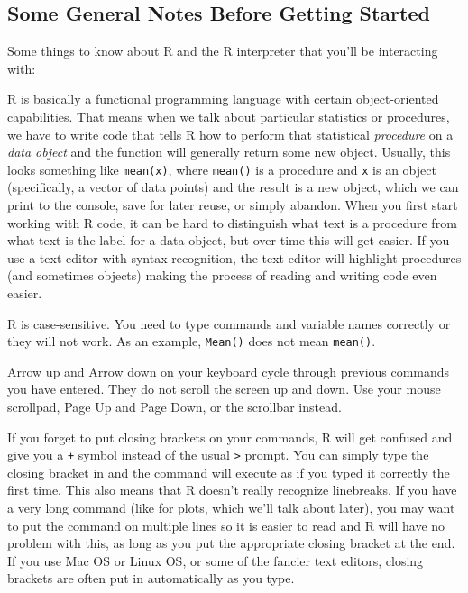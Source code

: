 \documentclass[12pt]{article}\usepackage[]{graphicx}\usepackage[]{color}
\begin{document}
\subsection{Some General Notes Before Getting Started}

Some things to know about R and the R interpreter that you'll be interacting with:

\begin{itemize*}
\item R is basically a functional programming language with certain object-oriented capabilities. That means when we talk about particular statistics or procedures, we have to write code that tells R how to perform that statistical \emph{procedure} on a \emph{data object} and the function will generally return some new object. Usually, this looks something like \texttt{mean(x)}, where \texttt{mean()} is a procedure and \texttt{x} is an object (specifically, a vector of data points) and the result is a new object, which we can print to the console, save for later reuse, or simply abandon. When you first start working with R code, it can be hard to distinguish what text is a procedure from what text is the label for a data object, but over time this will get easier. If you use a text editor with syntax recognition, the text editor will highlight procedures (and sometimes objects) making the process of reading and writing code even easier.
\item R is case-sensitive. You need to type commands and variable names correctly or they will not work. As an example, \texttt{Mean()} does not mean \texttt{mean()}.
\item Arrow up and Arrow down on your keyboard cycle through previous commands you have entered. They do not scroll the screen up and down. Use your mouse scrollpad, Page Up and Page Down, or the scrollbar instead.
\item If you forget to put closing brackets on your commands, R will get confused and give you a \texttt{+} symbol instead of the usual \texttt{>} prompt. You can simply type the closing bracket in and the command will execute as if you typed it correctly the first time. This also means that R doesn't really recognize linebreaks. If you have a very long command (like for plots, which we'll talk about later), you may want to put the command on multiple lines so it is easier to read and R will have no problem with this, as long as you put the appropriate closing bracket at the end. If you use Mac OS or Linux OS, or some of the fancier text editors, closing brackets are often put in automatically as you type.
\end{itemize*}
\end{document}
